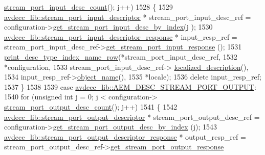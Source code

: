 \begin{DoxyCode}
      \hyperlink{classavdecc__lib_1_1configuration__descriptor_a836e1a36ce664bca990de217b53d36b3}{stream\_port\_input\_desc\_count}(); j++)
1528             \{
1529                 \hyperlink{classavdecc__lib_1_1stream__port__input__descriptor}{avdecc\_lib::stream\_port\_input\_descriptor} * 
      stream\_port\_input\_desc\_ref = configuration->\hyperlink{classavdecc__lib_1_1configuration__descriptor_ad05646251e84a4024f317dd82395b8f7}{get\_stream\_port\_input\_desc\_by\_index}(j
      );
1530                 \hyperlink{classavdecc__lib_1_1stream__port__input__descriptor__response}{avdecc\_lib::stream\_port\_input\_descriptor\_response}
       * input\_resp\_ref = stream\_port\_input\_desc\_ref->\hyperlink{classavdecc__lib_1_1stream__port__input__descriptor_af310caba5e55b84e2c04cf5c2dfb77f6}{get\_stream\_port\_input\_response}
      ();
1531                 \hyperlink{classcmd__line_ac47c21c03b69593b74e7c43201d0ba41}{print\_desc\_type\_index\_name\_row}(*stream\_port\_input\_desc\_ref,
1532                                                *configuration,
1533                                                stream\_port\_input\_desc\_ref->
      \hyperlink{classavdecc__lib_1_1descriptor__base_a1fb9de45567df344090a1407aa6b775f}{localized\_description}(),
1534                                                input\_resp\_ref->\hyperlink{classavdecc__lib_1_1descriptor__response__base_a133f7774946d80f82b8aaaa4cfbb7361}{object\_name}(),
1535                                                *locale);
1536                 \textcolor{keyword}{delete} input\_resp\_ref;
1537             \}
1538 
1539         \textcolor{keywordflow}{case} \hyperlink{namespaceavdecc__lib_ac7b7d227e46bc72b63ee9e9aae15902fa2b2dca37bb2c945a2b37b02231650b48}{avdecc\_lib::AEM\_DESC\_STREAM\_PORT\_OUTPUT}:
1540             \textcolor{keywordflow}{for} (\textcolor{keywordtype}{unsigned} \textcolor{keywordtype}{int} j = 0; j < configuration->
      \hyperlink{classavdecc__lib_1_1configuration__descriptor_a58cdf6527f31108945befa42ef682f2b}{stream\_port\_output\_desc\_count}(); j++)
1541             \{
1542                 \hyperlink{classavdecc__lib_1_1stream__port__output__descriptor}{avdecc\_lib::stream\_port\_output\_descriptor} * 
      stream\_port\_output\_desc\_ref = configuration->\hyperlink{classavdecc__lib_1_1configuration__descriptor_afc0e79843f9b98263f9be9d16197310b}{get\_stream\_port\_output\_desc\_by\_index}
      (j);
1543                 \hyperlink{classavdecc__lib_1_1stream__port__output__descriptor__response}{avdecc\_lib::stream\_port\_output\_descriptor\_response}
       * output\_resp\_ref = stream\_port\_output\_desc\_ref->\hyperlink{classavdecc__lib_1_1stream__port__output__descriptor_ad55a65e8648f66713ad5c9a7b9fa7181}{get\_stream\_port\_output\_response}

\end{DoxyCode}
